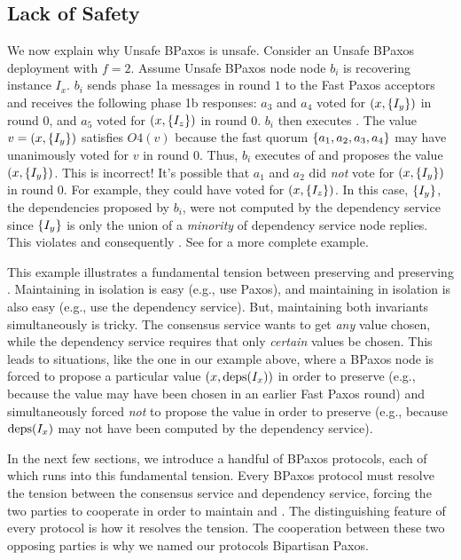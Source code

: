 \subsection{Lack of Safety}
We now explain why Unsafe BPaxos is unsafe. Consider an Unsafe BPaxos
deployment with $f = 2$. Assume Unsafe BPaxos node node $b_i$ is recovering
instance $I_x$. $b_i$ sends phase 1a messages in round $1$ to the Fast Paxos
acceptors and receives the following phase 1b responses:
  $a_3$ and $a_4$ voted for $(x, \{I_y\})$ in round $0$, and
  $a_5$ voted for $(x, \{I_z\})$ in round $0$.
$b_i$ then executes . The value $v = (x, \{I_y\})$
satisfies $O4(v)$ because the fast quorum $\{a_1, a_2, a_3, a_4\}$ may have
unanimously voted for $v$ in round $0$.  Thus, $b_i$ executes
 of  and proposes the value $(x,
\{I_y\})$.
%
This is incorrect! It's possible that $a_1$ and $a_2$ did \emph{not} vote for
$(x, \{I_y\})$ in round $0$. For example, they could have voted for $(x,
\{I_z\})$. In this case, $\{I_y\}$, the dependencies proposed by $b_i$,
were not computed by the dependency service since $\{I_y\}$ is only the union
of a \emph{minority} of dependency service node replies. This violates
 and consequently .
See  for a more complete example.

This example illustrates a fundamental tension between preserving
 and preserving .
Maintaining  in isolation is easy (e.g., use Paxos),
and maintaining  in isolation is also easy (e.g., use
the dependency service). But, maintaining both invariants simultaneously is
tricky. The consensus service wants to get \emph{any} value chosen, while the
dependency service requires that only \emph{certain} values be chosen.
%
This leads to situations, like the one in our example above, where a BPaxos
node is forced to propose a particular value $(x, \text{deps}(I_x))$ in order to
preserve  (e.g., because the value may have been
chosen in an earlier Fast Paxos round) and simultaneously forced \emph{not} to
propose the value in order to preserve  (e.g.,
because $\text{deps}(I_x)$ may not have been computed by the dependency service).

In the next few sections, we introduce a handful of BPaxos protocols, each of
which runs into this fundamental tension. Every BPaxos protocol must resolve
the tension between the consensus service and dependency service, forcing the
two parties to cooperate in order to maintain  and
. The distinguishing feature of every protocol is how
it resolves the tension.  The cooperation between these two opposing parties is
why we named our protocols Bipartisan Paxos.
